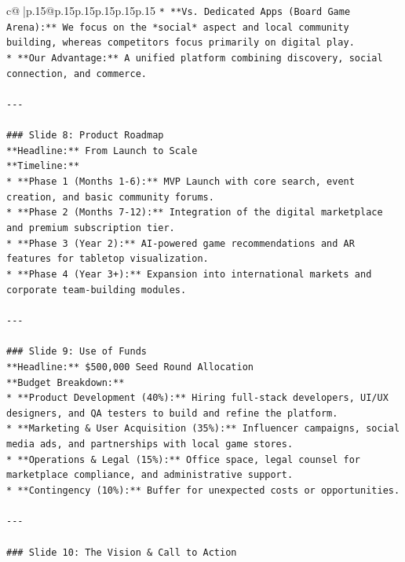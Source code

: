\documentclass{article}
\begin{document}
{\begin{supertabular}{c@{$\;$}|p{.15\linewidth}@{}p{.15\linewidth}p{.15\linewidth}p{.15\linewidth}p{.15\linewidth}p{.15\linewidth}}
{{{\texttt{*   **Vs. Dedicated Apps (Board Game Arena):** We focus on the *social* aspect and local community building, whereas competitors focus primarily on digital play.} \\
\texttt{*   **Our Advantage:** A unified platform combining discovery, social connection, and commerce.} \\
\\ 
\texttt{{-}{-}{-}} \\
\\ 
\texttt{\#\#\# Slide 8: Product Roadmap} \\
\texttt{**Headline:** From Launch to Scale} \\
\texttt{**Timeline:**} \\
\texttt{*   **Phase 1 (Months 1{-}6):** MVP Launch with core search, event creation, and basic community forums.} \\
\texttt{*   **Phase 2 (Months 7{-}12):** Integration of the digital marketplace and premium subscription tier.} \\
\texttt{*   **Phase 3 (Year 2):** AI{-}powered game recommendations and AR features for tabletop visualization.} \\
\texttt{*   **Phase 4 (Year 3+):** Expansion into international markets and corporate team{-}building modules.} \\
\\ 
\texttt{{-}{-}{-}} \\
\\ 
\texttt{\#\#\# Slide 9: Use of Funds} \\
\texttt{**Headline:** \$500,000 Seed Round Allocation} \\
\texttt{**Budget Breakdown:**} \\
\texttt{*   **Product Development (40\%):** Hiring full{-}stack developers, UI/UX designers, and QA testers to build and refine the platform.} \\
\texttt{*   **Marketing \& User Acquisition (35\%):** Influencer campaigns, social media ads, and partnerships with local game stores.} \\
\texttt{*   **Operations \& Legal (15\%):** Office space, legal counsel for marketplace compliance, and administrative support.} \\
\texttt{*   **Contingency (10\%):** Buffer for unexpected costs or opportunities.} \\
\\ 
\texttt{{-}{-}{-}} \\
\\ 
\texttt{\#\#\# Slide 10: The Vision \& Call to Action} \\
}}}
\end{supertabular}}
\end{document}
